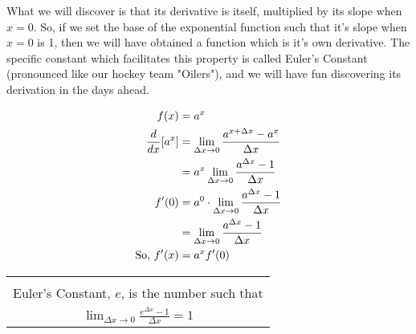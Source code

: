 \documentclass{article}
\begin{document}
What we will discover is that its derivative is itself, multiplied by its slope when $x=0$. So, if we set the base of the exponential function such that it's slope when $x=0$ is 1, then we will have obtained a function which is it's own derivative. The specific constant which facilitates this property is called Euler's Constant (pronounced like our hockey team "Oilers"), and we will have fun discovering its derivation in the days ahead.

\vspace{10pt}

\begin{align*}
f(x)&=a^x\\
\frac{d}{dx}[a^x]&=\lim_{\Delta x\to0}\frac{a^{x+\Delta x}-a^x}{\Delta x}\\
&=a^x\lim_{\Delta x\to0}\frac{a^{\Delta x}-1}{\Delta x}\\
f^\prime(0)&=a^0\cdot\lim_{\Delta x\to0}\frac{a^{\Delta x}-1}{\Delta x}\\
&=\lim_{\Delta x\to0}\frac{a^{\Delta x}-1}{\Delta x}\\
\textnormal{So, }f^\prime(x)&=a^xf^\prime(0)
\end{align*}

\begin{center}
\begin{tabular}{|l|}
\hline\\
Euler's Constant, $e$, is the number such that\\[1em]
\multicolumn{1}{|c|}{$\displaystyle\lim_{\Delta x\to0}\frac{e^{\Delta x}-1}{\Delta x}=1$}\\[1.5em]
\hline
\end{tabular}
\end{center}
\end{document}
